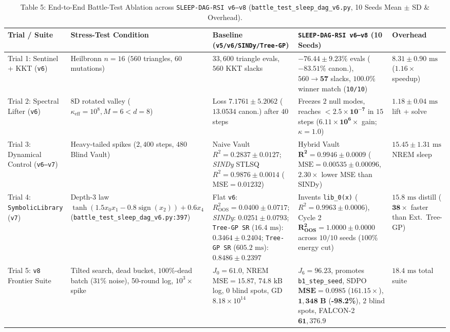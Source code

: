 \documentclass[11pt,a4paper]{article}
\begin{document}
\begin{table}[ht!]
\centering
\caption{Table 5: End-to-End Battle-Test Ablation across \texttt{SLEEP-DAG-RSI v6--v8} (\texttt{battle\_test\_sleep\_dag\_v6.py}, 10 Seeds Mean $\pm$ SD \& Overhead).}
\label{tab:battle_test}
\footnotesize
\begin{tabular}{p{2.8cm}p{3.3cm}p{3.6cm}p{4.2cm}p{1.6cm}}
\toprule
\textbf{Trial / Suite} & \textbf{Stress-Test Condition} & \textbf{Baseline (\texttt{v5/v6/SINDy/Tree-GP})} & \textbf{\texttt{SLEEP-DAG-RSI v6--v8} (10 Seeds)} & \textbf{Overhead} \\
\midrule
Trial 1: Sentinel + KKT (\texttt{v6}) & Heilbronn $n=16$ ($560$ triangles, $60$ mutations) & $33,600$ triangle evals, $560$ KKT slacks & $\mathbf{-76.44 \pm 9.23\%}$ evals ($-83.51\%$ canon.), $560 \to \mathbf{57}$ slacks, $\mathbf{100.0\%}$ winner match (\texttt{10/10}) & $8.31 \pm 0.90\text{ ms}$ ($\mathbf{1.16\times}$ speedup) \\
\addlinespace
Trial 2: Spectral Lifter (\texttt{v6}) & 8D rotated valley ($\kappa_{\text{eff}} = 10^8, M=6<d=8$) & Loss $7.1761 \pm 5.2062$ ($13.0534$ canon.) after $40$ steps & Freezes $2$ null modes, reaches $\mathbf{< 2.5\times 10^{-7}}$ in $15$ steps ($\mathbf{6.11\times 10^6\times}$ gain; $\kappa=1.0$) & $1.18 \pm 0.04\text{ ms}$ lift + solve \\
\addlinespace
Trial 3: Dynamical Control (\texttt{v6--v7}) & Heavy-tailed spikes ($2,400$ steps, $480$ Blind Vault) & Naive Vault $R^2 = 0.2837 \pm 0.0127$; \emph{SINDy} STLSQ \cite{brunton2016} $R^2 = 0.9876 \pm 0.0014$ ($\text{MSE} = 0.01232$) & Hybrid Vault $\mathbf{R^2 = 0.9946 \pm 0.0009}$ ($\text{MSE} = \mathbf{0.00535 \pm 0.00096}$, $\mathbf{2.30\times}$ lower MSE than SINDy) & $15.45 \pm 1.31\text{ ms}$ NREM sleep \\
\addlinespace
Trial 4: \texttt{SymbolicLibrary} (\texttt{v7}) & Depth-3 law $\tanh(1.5 x_0 x_1 - 0.8\operatorname{sign}(x_2)) + 0.6 x_4$ (\texttt{battle\_test\_sleep\_dag\_v6.py:397}) & Flat \texttt{v6}: $R^2_{\text{OOS}} = 0.0400 \pm 0.0717$; \emph{SINDy}: $0.0251 \pm 0.0793$; \texttt{Tree-GP SR} ($16.4\text{ ms}$): $0.3464 \pm 0.2404$; \texttt{Tree-GP SR} ($605.2\text{ ms}$): $0.8486 \pm 0.2397$ & Invents \texttt{lib\_0(x)} ($R^2 = 0.9963 \pm 0.0006$), Cycle 2 $\mathbf{R^2_{\text{OOS}} = 1.0000 \pm 0.0000}$ across $10/10$ seeds ($100\%$ energy cut) & $15.8\text{ ms}$ distill ($\mathbf{38\times}$ faster than Ext.\ Tree-GP) \\
\addlinespace
Trial 5: \texttt{v8} Frontier Suite & Tilted search, dead bucket, $100\%$-dead batch ($31\%$ noise), 50-round log, $10^3\times$ spike & $J_0=61.0$, NREM $\text{MSE}=15.87$, $74.8\text{ kB}$ log, $0$ blind spots, GD $8.18\times 10^{14}$ & $J_6=\mathbf{96.23}$, promotes \texttt{b1\_step\_seed}, SDPO $\mathbf{\text{MSE}=0.0985}$ ($\mathbf{161.15\times}$), $\mathbf{1,348\text{ B}}$ (\textbf{-98.2\%}), $2$ blind spots, FALCON-2 $\mathbf{61,376.9}$ & $18.4\text{ ms}$ total suite \\
\bottomrule
\end{tabular}
\end{table}
\end{document}
